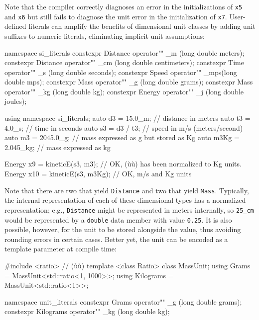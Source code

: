\noindent Note that the compiler correctly diagnoses an error in the
initializations of \lstinline!x5! and \lstinline!x6! but still fails to
diagnose the unit error in the initialization of \lstinline!x7!.
User-defined literals can amplify the benefits of dimensional unit
classes by adding unit suffixes to numeric literals, eliminating
implicit unit assumptions:

\begin{emcppslisting}[emcppsbatch=e20]
namespace si_literals
{
    constexpr Distance operator"" _m  (long double meters);
    constexpr Distance operator"" _cm (long double centimeters);
    constexpr Time     operator"" _s  (long double seconds);
    constexpr Speed    operator"" _mps(long double mps);
    constexpr Mass     operator"" _g  (long double grams);
    constexpr Mass     operator"" _kg (long double kg);
    constexpr Energy   operator"" _j  (long double joules);
}

using namespace si_literals;
auto d3   = 15.0_m;    // distance in meters
auto t3   = 4.0_s;     // time in seconds
auto s3   = d3 / t3;   // speed in m/s (meters/second)
auto m3   = 2045.0_g;  // mass expressed as g but stored as Kg
auto m3Kg = 2.045_kg;  // mass expressed as kg

Energy x9  = kineticE(s3, m3);    // OK, (ù{}ù) has been normalized to Kg units.
Energy x10 = kineticE(s3, m3Kg);  // OK, m/s and Kg units
\end{emcppslisting}

\noindent Note that there are two  that yield \lstinline!Distance! and
two  that yield \lstinline!Mass!. Typically, the internal
representation of each of these dimensional types has a normalized
representation; e.g., \lstinline!Distance! might be represented in meters
internally, so \lstinline!25_cm! would be represented by a \lstinline!double!
data member with value \lstinline!0.25!. It is also possible, however, for
the unit to be stored alongside the value, thus avoiding rounding errors
in certain cases. Better yet, the unit can be encoded as a template
parameter at compile time:

\begin{emcppslisting}
#include <ratio>  // (ù{}ù)
template <class Ratio> class MassUnit;
using Grams     = MassUnit<std::ratio<1, 1000>>;
using Kilograms = MassUnit<std::ratio<1>>;

namespace unit_literals
{
    constexpr Grams     operator"" _g  (long double grams);
    constexpr Kilograms operator"" _kg (long double kg);
}
\end{emcppslisting}

